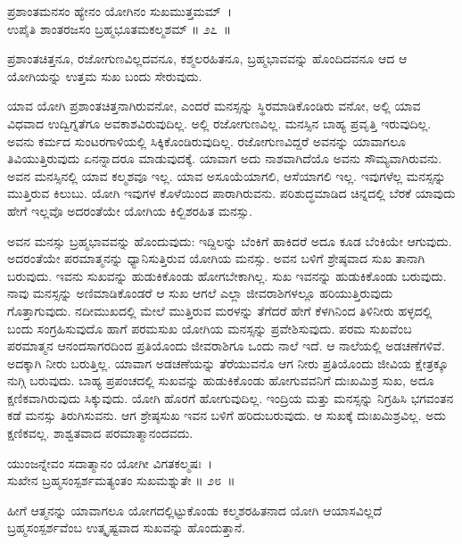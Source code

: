\begin{shloka}
ಪ್ರಶಾಂತಮನಸಂ ಹ್ಯೇನಂ ಯೋಗಿನಂ ಸುಖಮುತ್ತಮಮ್~।\\ಉಪೈತಿ ಶಾಂತರಜಸಂ ಬ್ರಹ್ಮಭೂತಮಕಲ್ಮಶಮ್ \hfill॥ ೨೭~॥
\end{shloka}

\begin{artha}
ಪ್ರಶಾಂತಚಿತ್ತನೂ, ರಜೋಗುಣವಿಲ್ಲದವನೂ, ಕಶ್ಮಲರಹಿತನೂ, ಬ್ರಹ್ಮಭಾವವನ್ನು ಹೊಂದಿದವನೂ ಆದ ಆ ಯೋಗಿಯನ್ನು ಉತ್ತಮ ಸುಖ ಬಂದು ಸೇರುವುದು.
\end{artha}

ಯಾವ ಯೋಗಿ ಪ್ರಶಾಂತಚಿತ್ತನಾಗಿರುವನೋ, ಎಂದರೆ ಮನಸ್ಸನ್ನು ಸ್ಥಿರಮಾಡಿಕೊಂಡಿರು ವನೋ, ಅಲ್ಲಿ ಯಾವ ವಿಧವಾದ ಉದ್ವಿಗ್ನತೆಗೂ ಅವಕಾಶವಿರುವುದಿಲ್ಲ. ಅಲ್ಲಿ ರಜೋಗುಣವಿಲ್ಲ. ಮನಸ್ಸಿನ ಬಾಹ್ಯ ಪ್ರವೃತ್ತಿ ಇರುವುದಿಲ್ಲ. ಅವನು ಕರ್ಮದ ಸುಂಟರಗಾಳಿಯಲ್ಲಿ ಸಿಕ್ಕಿಕೊಂಡಿರುವುದಿಲ್ಲ. ರಜೋಗುಣವಿದ್ದರೆ ಅವನನ್ನು ಯಾವಾಗಲೂ ತಿವಿಯುತ್ತಿರುವುದು ಏನನ್ನಾದರೂ ಮಾಡುವುದಕ್ಕೆ. ಯಾವಾಗ ಅದು ನಾಶವಾಗಿದೆಯೊ ಅವನು ಸೌಮ್ಯವಾಗಿರುವನು. ಅವನ ಮನಸ್ಸಿನಲ್ಲಿ ಯಾವ ಕಲ್ಮಶವೂ ಇಲ್ಲ. ಯಾವ ಅಸೂಯೆಯಾಗಲಿ, ಆಸೆಯಾಗಲಿ ಇಲ್ಲ. ಇವುಗಳೆಲ್ಲ ಮನಸ್ಸನ್ನು ಮುತ್ತಿರುವ ಕಿಲುಬು. ಯೋಗಿ ಇವುಗಳ ಕೊಳೆಯಿಂದ ಪಾರಾಗಿರುವನು. ಪರಿಶುದ್ಧಮಾಡಿದ ಚಿನ್ನದಲ್ಲಿ ಬೆರಕೆ ಯಾವುದು ಹೇಗೆ ಇಲ್ಲವೊ ಅದರಂತೆಯೇ ಯೋಗಿಯ ಕಿಲ್ಬಿಶರಹಿತ ಮನಸ್ಸು.

ಅವನ ಮನಸ್ಸು ಬ್ರಹ್ಮಭಾವವನ್ನು ಹೊಂದುವುದು: ಇದ್ದಿಲನ್ನು ಬೆಂಕಿಗೆ ಹಾಕಿದರೆ ಅದೂ ಕೂಡ ಬೆಂಕಿಯೇ ಆಗುವುದು. ಅದರಂತೆಯೇ ಪರಮಾತ್ಮನನ್ನು ಧ್ಯಾನಿಸುತ್ತಿರುವ ಯೋಗಿಯ ಮನಸ್ಸು. ಅವನ ಬಳಿಗೆ ಶ್ರೇಷ್ಠವಾದ ಸುಖ ತಾನಾಗಿ ಬರುವುದು. ಇವನು ಸುಖವನ್ನು ಹುಡುಕಿಕೊಂಡು ಹೋಗಬೇಕಾಗಿಲ್ಲ. ಸುಖ ಇವನನ್ನು ಹುಡುಕಿಕೊಂಡು ಬರುವುದು. ನಾವು ಮನಸ್ಸನ್ನು ಅಣಿಮಾಡಿಕೊಂಡರೆ ಆ ಸುಖ ಆಗಲೆ ಎಲ್ಲಾ ಜೀವರಾಶಿಗಳಲ್ಲೂ ಹರಿಯುತ್ತಿರುವುದು ಗೊತ್ತಾಗುವುದು. ನದೀಮುಖದಲ್ಲಿ ಮೇಲೆ ಮುತ್ತಿರುವ ಮರಳನ್ನು ತೆಗೆದರೆ ಹೇಗೆ ಕೆಳಗಿನಿಂದ ತಿಳಿನೀರು ಹಳ್ಳದಲ್ಲಿ ಬಂದು ಸಂಗ್ರಹಿಸುವುದೊ ಹಾಗೆ ಪರಮಸುಖ ಯೋಗಿಯ ಮನಸ್ಸನ್ನು ಪ್ರವೇಶಿಸುವುದು. ಪರಮ ಸುಖವೆಂಬ ಪರಮಾತ್ಮನ ಆನಂದಸಾಗರದಿಂದ ಪ್ರತಿಯೊಂದು ಜೀವರಾಶಿಗೂ ಒಂದು ನಾಲೆ ಇದೆ. ಆ ನಾಲೆಯಲ್ಲಿ ಅಡಚಣೆಗಳಿವೆ. ಅದಕ್ಕಾಗಿ ನೀರು ಬರುತ್ತಿಲ್ಲ. ಯಾವಾಗ ಅಡಚಣೆಯನ್ನು ತೆರೆಯುವನೊ ಆಗ ನೀರು ಪ್ರತಿಯೊಂದು ಜೀವಿಯ ಕ್ಷೇತ್ರಕ್ಕೂ ನುಗ್ಗಿ ಬರುವುದು. ಬಾಹ್ಯ ಪ್ರಪಂಚದಲ್ಲಿ ಸುಖವನ್ನು ಹುಡುಕಿಕೊಂಡು ಹೋಗುವವನಿಗೆ ದುಃಖಮಿಶ್ರ ಸುಖ, ಅದೂ ಕ್ಷಣಿಕವಾಗಿರುವುದು ಸಿಕ್ಕುವುದು. ಯೋಗಿ ಹೊರಗೆ ಹೋಗುವುದಿಲ್ಲ. ಇಂದ್ರಿಯ ಮತ್ತು ಮನಸ್ಸನ್ನು ನಿಗ್ರಹಿಸಿ ಭಗವಂತನ ಕಡೆ ಮನಸ್ಸು ತಿರುಗಿಸುವನು. ಆಗ ಶ್ರೇಷ್ಠಸುಖ ಇವನ ಬಳಿಗೆ ಹರಿದುಬರುವುದು. ಆ ಸುಖಕ್ಕೆ ದುಃಖಮಿಶ್ರವಿಲ್ಲ. ಅದು ಕ್ಷಣಿಕವಲ್ಲ. ಶಾಶ್ವತವಾದ ಪರಮಾತ್ಮಾನಂದವದು.

\begin{shloka}
ಯುಂಜನ್ನೇವಂ ಸದಾತ್ಮಾನಂ ಯೋಗೀ ವಿಗತಕಲ್ಮಷಃ~।\\ಸುಖೇನ ಬ್ರಹ್ಮಸಂಸ್ಪರ್ಶಮತ್ಯಂತಂ ಸುಖಮಶ್ನುತೇ \hfill॥ ೨೮~॥
\end{shloka}

\begin{artha}
ಹೀಗೆ ಆತ್ಮನನ್ನು ಯಾವಾಗಲೂ ಯೋಗದಲ್ಲಿಟ್ಟುಕೊಂಡು ಕಲ್ಮಶರಹಿತನಾದ ಯೋಗಿ ಆಯಾಸವಿಲ್ಲದೆ ಬ್ರಹ್ಮಸಂಸ್ಪರ್ಶವೆಂಬ ಉತ್ಕೃಷ್ಟವಾದ ಸುಖವನ್ನು ಹೊಂದುತ್ತಾನೆ.
\end{artha}


